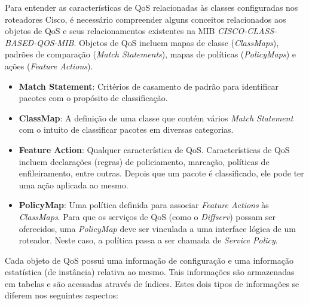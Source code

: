 \label{apend:relacionamentos_MIB}
	
	Para entender as características de QoS relacionadas às classes configuradas nos roteadores Cisco, é necessário compreender alguns conceitos relacionados aos objetos de QoS e seus relacionamentos existentes na MIB \textit{CISCO-CLASS-BASED-QOS-MIB}. Objetos de QoS incluem mapas de classe (\textit{ClassMaps}), padrões de comparação (\textit{Match Statements}), mapas de políticas (\textit{PolicyMaps}) e ações (\textit{Feature Actions}).
	
\begin{itemize}
	\item \textbf{Match Statement}: Critérios de casamento de padrão para identificar pacotes com o propósito de classificação.
	
	\item \textbf{ClassMap}: A definição de uma classe que contém vários \textit{Match Statement} com o intuito de classificar pacotes em diversas categorias.
	
	\item \textbf{Feature Action}: Qualquer característica de QoS. Características de QoS incluem  declarações (regras) de policiamento, marcação, políticas de enfileiramento, entre outras. Depois que um pacote é classificado, ele pode ter uma ação aplicada ao mesmo.
	
	\item \textbf{PolicyMap}: Uma política definida para associar \textit{Feature Actions} às \textit{ClassMaps}. Para que os serviços de QoS (como o \textit{Diffserv}) possam ser oferecidos, uma \textit{PolicyMap} deve ser vinculada a uma interface lógica de um roteador. Neste caso, a política passa a ser chamada de \textit{Service Policy}.
\end{itemize}

	Cada objeto de QoS possui uma informação de configuração e uma informação estatística (de instância) relativa ao mesmo. Tais informações são armazenadas em tabelas e são acessadas através de índices. Estes dois tipos de informações se diferem nos seguintes aspectos:
	
